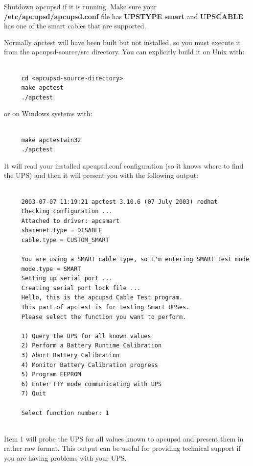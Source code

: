 Shutdown apcupsd if it is running. Make sure your {\bf
/etc/apcupsd/apcupsd.conf} file has {\bf UPSTYPE smart} and {\bf UPSCABLE} has
one of the smart cables that are supported.  

Normally apctest will have been built but not installed, so you must execute
it from the \lt{}apcupsd-source\gt{}/src directory. You can explicitly build
it on Unix with: 

\footnotesize
\begin{verbatim}
     
     cd <apcupsd-source-directory>
     make apctest
     ./apctest
\end{verbatim}
\normalsize

or on Windows systems with: 

\footnotesize
\begin{verbatim}
     
     make apctestwin32
     ./apctest
\end{verbatim}
\normalsize

It will read your installed apcupsd.conf configuration (so it knows where to
find the UPS) and then it will present you with the following output: 

\footnotesize
\begin{verbatim}
     
     2003-07-07 11:19:21 apctest 3.10.6 (07 July 2003) redhat
     Checking configuration ...
     Attached to driver: apcsmart
     sharenet.type = DISABLE
     cable.type = CUSTOM_SMART
     
     You are using a SMART cable type, so I'm entering SMART test mode
     mode.type = SMART
     Setting up serial port ...
     Creating serial port lock file ...
     Hello, this is the apcupsd Cable Test program.
     This part of apctest is for testing Smart UPSes.
     Please select the function you want to perform.
     
     1) Query the UPS for all known values
     2) Perform a Battery Runtime Calibration
     3) Abort Battery Calibration
     4) Monitor Battery Calibration progress
     5) Program EEPROM
     6) Enter TTY mode communicating with UPS
     7) Quit
     
     Select function number: 1
     
\end{verbatim}
\normalsize

Item 1 will probe the UPS for all values known to apcupsd and present them in
rather raw format. This output can be useful for providing technical support
if you are having problems with your UPS.  

